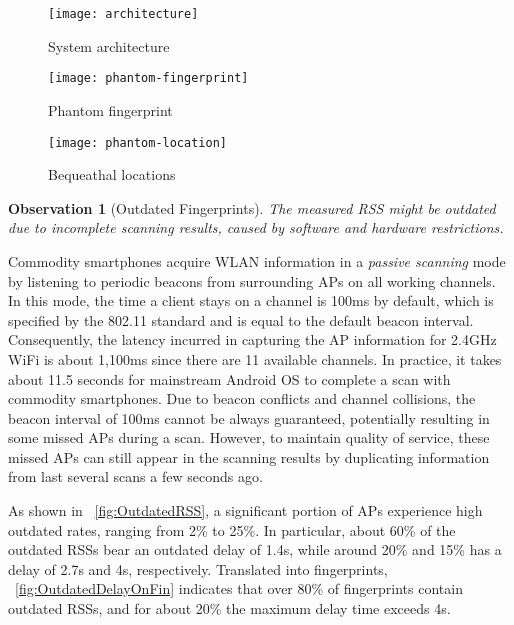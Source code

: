 \documentclass[10pt,conference,compsocconf,letterpaper]{./sty/IEEEtran}
\def\1figwidth{0.9\textwidth}
\def\3figwidth{0.3\textwidth}
\newcommand{\term}[1]{{\it #1}}
\newtheorem{obsv}{Observation}
\newcommand{\rev}[1]{{\color{blue}#1}} \newcommand{\com}[1]{\textbf{\color{red}(COMMENT: #1)}} \else
\newcommand{\rev}[1]{#1}
\newcommand{\com}[1]{}
\begin{document}
\begin{figure*}[t]
	\centering
	\begin{minipage}[t]{\3figwidth}\centering
		\texttt{[image: architecture]}
  		\caption{System architecture}
  		\label{fig:architecture}
	\end{minipage}
	\hspace{0.2in}
	\begin{minipage}[t]{\3figwidth}\centering
		\texttt{[image: phantom-fingerprint]}
  		\caption{Phantom fingerprint}
  		\label{fig:phantom-fingerprint}
	\end{minipage}
	\hspace{0.0in}
	\begin{minipage}[t]{\3figwidth}\centering
		\centering
  		\texttt{[image: phantom-location]}
  		\caption{Bequeathal locations}
 		\label{fig:phantom-location}
	\end{minipage}	\hspace{0.1in}
\end{figure*}

\begin{obsv}[Outdated Fingerprints]
The measured RSS might be outdated due to incomplete scanning results, caused by software and hardware restrictions.
\end{obsv}
Commodity smartphones acquire WLAN information in a \term{passive scanning} mode by listening to  periodic beacons from surrounding APs on all working channels. In this mode, the time a client stays on a channel is 100ms by default, which is specified by the 802.11 standard \cite{ieee2012wireless} and is equal to the default beacon interval. Consequently, the latency incurred in capturing the AP information for 2.4GHz WiFi is about 1,100ms since there are 11 available channels. In practice, it takes about 11.5 seconds for mainstream Android OS to complete a scan with commodity smartphones. Due to beacon conflicts and channel collisions, the beacon interval of 100ms cannot be always guaranteed, potentially resulting in some missed APs during a scan. However, to maintain quality of service, these missed APs can still appear in the scanning results by duplicating information from last several scans a few seconds ago.

As shown in \figurename~\ref{fig:OutdatedRSS}, a significant portion of APs experience high outdated rates, ranging from 2\% to 25\%. In particular, about 60\% of the outdated RSSs bear an outdated delay of 1.4s, while around 20\% and 15\% has a delay of 2.7s and 4s, respectively. \rev{Translated into fingerprints, \figurename~\ref{fig:OutdatedDelayOnFin} indicates that} over 80\% of fingerprints contain outdated RSSs, and for about 20\% the maximum delay time exceeds 4s. 
\end{document}
